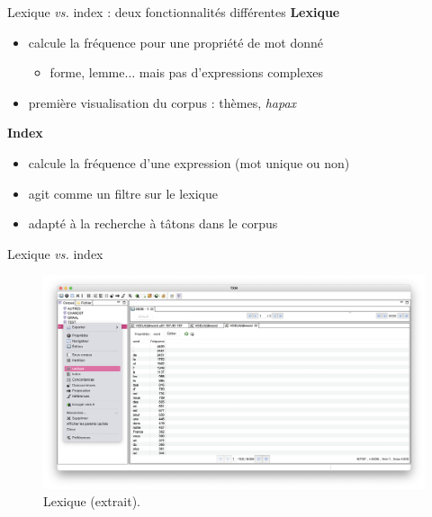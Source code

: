 \documentclass[xetex,xcolor={table,usenames,dvipsnames}]{beamer}
\newcommand{\bolder}[1]{{\color{purple}\bfseries#1}}
\begin{document}
\begin{frame}{Lexique \textit{vs.} index : deux fonctionnalités différentes}
	\bolder{Lexique}
	\begin{itemize}
		\item calcule la fréquence pour une propriété de mot donné
		\begin{itemize}
		 \item forme, lemme$\dots$ mais pas d'expressions complexes
		\end{itemize}
		\item première visualisation du corpus : thèmes, \textit{hapax}
	\end{itemize}
	\bolder{Index}
	\begin{itemize}
		\item calcule la fréquence d'une expression (mot unique ou non)
		\item agit comme un filtre sur le lexique
		\item adapté à la recherche à tâtons dans le corpus
	\end{itemize}
\end{frame}

\begin{frame}{Lexique \textit{vs.} index}
		\begin{figure}[h] %
		\centering
		\includegraphics[width=1\linewidth]{img/lexique.png}
		\caption{Lexique (extrait).}
		\label{fig:ling_out_TAL}
	\end{figure}
\end{frame}
\end{document}
